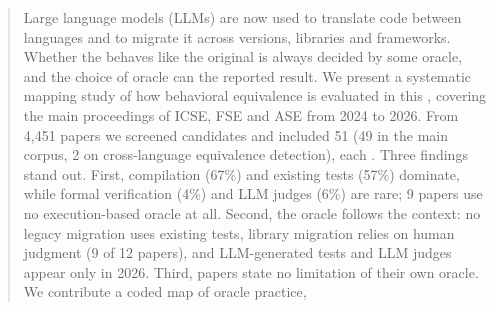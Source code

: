 \begin{abstract}
Large language models (LLMs) are now used to translate code between languages and to migrate it across versions, libraries and frameworks. Whether the  behaves like the original is always decided by some oracle, and the choice of oracle can  the reported result. We present a systematic mapping study of how behavioral equivalence is evaluated in this , covering the main proceedings of ICSE, FSE and ASE from 2024 to 2026. From 4,451 papers we screened  candidates and included 51 (49 in the main corpus, 2 on cross-language equivalence detection), each . Three findings stand out. First, compilation (67\%) and existing tests (57\%) dominate, while formal verification (4\%) and LLM judges (6\%) are rare; 9 papers use no execution-based oracle at all. Second, the oracle follows the context: no legacy migration uses existing tests, library migration relies on human judgment (9 of 12 papers), and LLM-generated tests and LLM judges appear only in 2026.  Third,  papers state no limitation of their own oracle. We contribute a coded map of oracle practice, 
\end{abstract}
